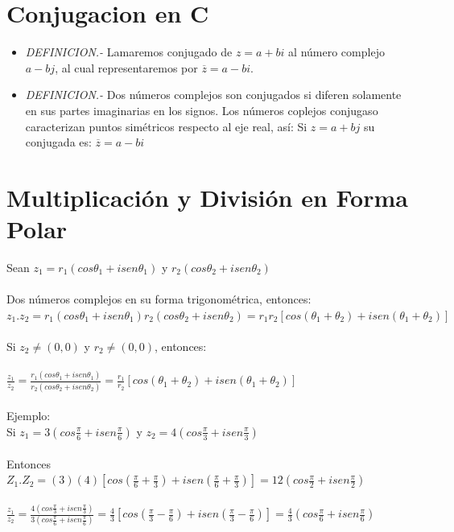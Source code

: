 \documentclass[10pt,a4paper]{book}
\begin{document}
\section{Conjugacion en C}
\begin{small}
\begin{itemize}
\item 
\emph{DEFINICION.-} Lamaremos conjugado de $z=a+bi$ al número complejo $a-bj$, al cual representaremos por $\overline{z}=a-bi$.
\item
\emph{DEFINICION.-} Dos números complejos son conjugados si diferen solamente en sus partes imaginarias en los signos.
Los números coplejos conjugaso caracterizan puntos simétricos respecto al eje real, así: Si $z=a+bj$ su conjugada es: $\overline{z}=a-bi$\\
\end{itemize}
\end{small}
\section{Multiplicación y División en Forma Polar}
Sean $z_1 = r_1(cos\theta_1 + isen\theta_1)$  y  $r_2(cos\theta_2+isen\theta_2)$\\
\\
Dos números complejos en su forma trigonométrica, entonces:\\
$z_1.z_2=r_1(cos\theta_1 +isen\theta_1)r_2(cos\theta_2 +isen\theta_2)=r_1r_2[cos(\theta_1+\theta_2)+isen(\theta_1+\theta_2)]$\\
\\
Si $z_2\neq(0,0)$ y $r_2\neq(0,0)$, entonces:\\
\\
$\displaystyle \frac{z_1}{z_2}=\displaystyle \frac{r_1(cos\theta_1 + isen\theta_1)}{r_2(cos\theta_2 +i sen\theta_2)}=\displaystyle \frac{r_1}{r_2}[cos(\theta_1+\theta_2)+isen(\theta_1+\theta_2)]$\\
\\
Ejemplo:\\
Si $z_1=3(cos\displaystyle \frac{\pi}{6}+isen\displaystyle \frac{\pi}{6})$ y $z_2=4(cos\displaystyle \frac{\pi}{3}+isen\displaystyle \frac{\pi}{3})$\\
\\
Entonces $Z_1.Z_2=(3)(4)[cos(\displaystyle \frac{\pi}{6}+\displaystyle \frac{\pi}{3})+isen(\displaystyle \frac{\pi}{6}+\displaystyle \frac{\pi}{3})]=12(cos\displaystyle \frac{\pi}{2}+isen\displaystyle \frac{\pi}{2})$\\
\\
$\displaystyle \frac{z_1}{z_2}=\displaystyle \frac{4(cos\displaystyle \frac{\pi}{3}+isen\displaystyle \frac{\pi}{3})}{3(cos\displaystyle \frac{\pi}{6}+isen\displaystyle \frac{\pi}{6})}=\displaystyle \frac{4}{3}[cos(\displaystyle \frac{\pi}{3}-\displaystyle \frac{\pi}{6})+isen(\displaystyle \frac{\pi}{3}-\displaystyle \frac{\pi}{6})]=\displaystyle \frac{4}{3}(cos\displaystyle \frac{\pi}{6}+isen\displaystyle \frac{\pi}{6})$
\end{document}
